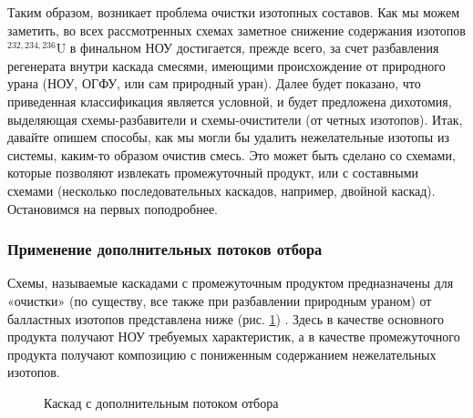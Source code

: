 Таким образом, возникает проблема очистки изотопных составов.
Как мы можем заметить, во всех рассмотренных схемах заметное снижение содержания изотопов $^{232,234,236}$U в финальном НОУ достигается, прежде всего, за счет разбавления регенерата внутри каскада смесями, имеющими происхождение от природного урана (НОУ, ОГФУ, или сам природный уран). Далее будет показано, что приведенная классификация является условной, и будет предложена дихотомия, выделяющая схемы-разбавители и схемы-очистители (от четных изотопов). Итак, давайте опишем способы, как мы могли бы удалить нежелательные изотопы из системы, каким-то образом очистив смесь. Это может быть сделано со схемами, которые позволяют извлекать промежуточный продукт, или с составными схемами (несколько последовательных каскадов, например, двойной каскад). Остановимся на первых поподробнее.

\subsubsection{Применение дополнительных потоков отбора}
Схемы, называемые каскадами с промежуточным продуктом предназначены для «очистки» (по существу, все также при разбавлении природным ураном) от балластных изотопов представлена ниже (рис. \ref{fig:3_out}) \cite{palkinAnaliticheskiyRaschetSoderzhaniya2007}. Здесь в качестве основного продукта получают НОУ требуемых характеристик, а в качестве промежуточного продукта получают композицию с пониженным содержанием нежелательных изотопов.
\begin{figure}[ht]
  \caption{Каскад с дополнительным потоком отбора}\label{fig:3_out}
\end{figure}


